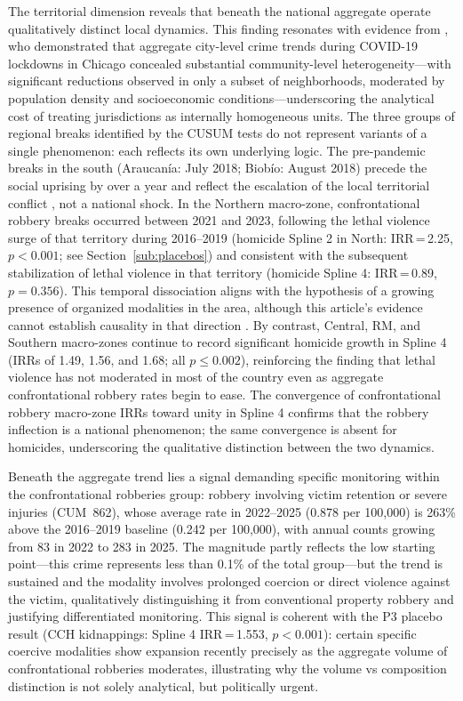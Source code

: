 \documentclass[pdflatex,sn-basic]{sn-jnl}
\begin{document}
The territorial dimension reveals that beneath the national aggregate operate qualitatively distinct local dynamics. This finding resonates with evidence from \citet{campedelli2020}, who demonstrated that aggregate city-level crime trends during COVID-19 lockdowns in Chicago concealed substantial community-level heterogeneity---with significant reductions observed in only a subset of neighborhoods, moderated by population density and socioeconomic conditions---underscoring the analytical cost of treating jurisdictions as internally homogeneous units. The three groups of regional breaks identified by the CUSUM tests do not represent variants of a single phenomenon: each reflects its own underlying logic. The pre-pandemic breaks in the south (Araucan\'ia: July 2018; Biob\'io: August 2018) precede the social uprising by over a year and reflect the escalation of the local territorial conflict \citep{izquierdo2024}, not a national shock. In the Northern macro-zone, confrontational robbery breaks occurred between 2021 and 2023, following the lethal violence surge of that territory during 2016--2019 (homicide Spline 2 in North: IRR\,=\,2.25, $p<0.001$; see Section~\ref{sub:placebos}) and consistent with the subsequent stabilization of lethal violence in that territory (homicide Spline 4: IRR\,=\,0.89, $p=0.356$). This temporal dissociation aligns with the hypothesis of a growing presence of organized modalities in the area, although this article's evidence cannot establish causality in that direction \citep{bravo2024,crespo2023}. By contrast, Central, RM, and Southern macro-zones continue to record significant homicide growth in Spline 4 (IRRs of 1.49, 1.56, and 1.68; all $p\leq0.002$), reinforcing the finding that lethal violence has not moderated in most of the country even as aggregate confrontational robbery rates begin to ease. The convergence of confrontational robbery macro-zone IRRs toward unity in Spline 4 confirms that the robbery inflection is a national phenomenon; the same convergence is absent for homicides, underscoring the qualitative distinction between the two dynamics.

Beneath the aggregate trend lies a signal demanding specific monitoring within the confrontational robberies group: robbery involving victim retention or severe injuries (CUM~862), whose average rate in 2022--2025 (0.878 per 100,000) is 263\% above the 2016--2019 baseline (0.242 per 100,000), with annual counts growing from 83 in 2022 to 283 in 2025. The magnitude partly reflects the low starting point---this crime represents less than 0.1\% of the total group---but the trend is sustained and the modality involves prolonged coercion or direct violence against the victim, qualitatively distinguishing it from conventional property robbery and justifying differentiated monitoring. This signal is coherent with the P3 placebo result (CCH kidnappings: Spline 4 IRR\,=\,1.553, $p<0.001$): certain specific coercive modalities show expansion recently precisely as the aggregate volume of confrontational robberies moderates, illustrating why the volume vs composition distinction is not solely analytical, but politically urgent.
\end{document}
